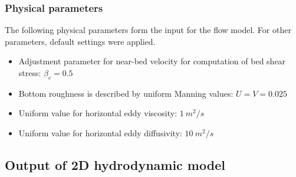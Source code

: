 \subsubsection{Physical parameters}
The following physical parameters form the input for the flow model. For other parameters, default settings were applied. 

\begin{itemize}
    \item Adjustment parameter for near-bed velocity for computation of bed shear stress: $\beta_c = 0.5$
    \item Bottom roughness is described by uniform Manning values: $U = V = 0.025$
    \item Uniform value for horizontal eddy viscosity: $1 ~m^2/s$
    \item Uniform value for horizontal eddy diffusivity: $10 ~m^2/s$
\end{itemize}


\subsection{Output of 2D hydrodynamic model}